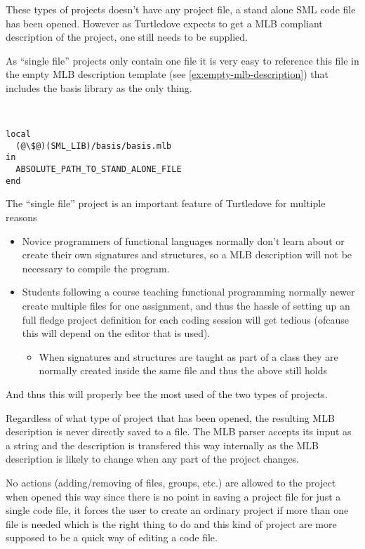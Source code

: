 These types of projects doesn't have any project file, a stand alone SML code
file has been opened. However as Turtledove expects to get a MLB compliant
description of the project, one still needs to be supplied.

As ``single file'' projects only contain one file it is very easy to reference
this file in the empty MLB description template (see
\ref{ex:empty-mlb-description}) that includes the basis library as the only
thing.

\begin{example}\
\begin{lstlisting}
local
  (@\$@)(SML_LIB)/basis/basis.mlb
in
  ABSOLUTE_PATH_TO_STAND_ALONE_FILE
end
\end{lstlisting}  
\end{example}


The ``single file'' project is an important feature of Turtledove for multiple
reasons

\begin{itemize}
\item Novice programmers of functional languages normally don't learn about or
  create their own signatures and structures, so a MLB description will not be
  necessary to compile the program.
  
\item Students following a course teaching functional programming normally newer
  create multiple files for one assignment, and thus the hassle of setting up an
  full fledge project definition for each coding session will get tedious
  (ofcause this will depend on the editor that is used).
  
  \begin{itemize}
  \item When signatures and structures are taught as part of a class they are
    normally created inside the same file and thus the above still holds
  \end{itemize}
\end{itemize}

And thus this will properly bee the most used of the two types of projects.

Regardless of what type of project that has been opened, the resulting MLB
description is never directly saved to a file. The MLB parser accepts its input
as a string and the description is transfered this way internally as the MLB
description is likely to change when any part of the project changes.

No actions (adding/removing of files, groups, etc.) are allowed to the project
when opened this way since there is no point in saving a project file for just a
single code file, it forces the user to create an ordinary project if more
than one file is needed which is the right thing to do and this kind of project
are more supposed to be a quick way of editing a code file.



